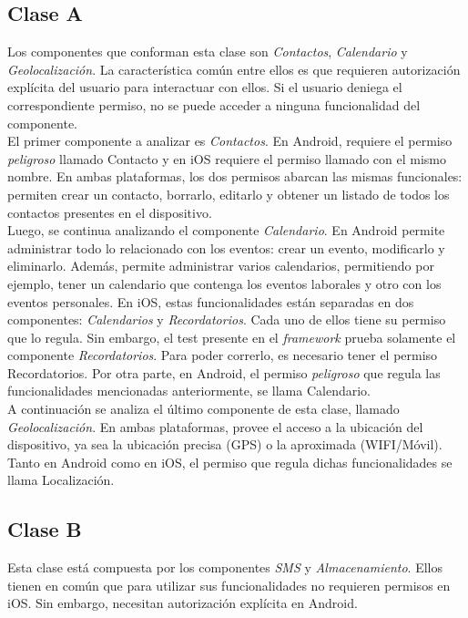 \subsection{Clase A}
Los componentes que conforman esta clase son \emph{Contactos}, \emph{Calendario} y \emph{Geolocalización}. La característica común entre ellos es que requieren autorización explícita del usuario para interactuar con ellos. Si el usuario deniega el correspondiente permiso, no se puede acceder a ninguna funcionalidad del componente.\\
El primer componente a analizar es \emph{Contactos}. En Android, requiere el permiso \textit{peligroso} llamado Contacto y en iOS requiere el permiso llamado con el mismo nombre. En ambas plataformas, los dos permisos abarcan las mismas funcionales: permiten crear un contacto, borrarlo, editarlo y obtener un listado de todos los contactos presentes en el dispositivo.\\

Luego, se continua analizando el componente \emph{Calendario}. En Android permite administrar todo lo relacionado con los eventos: crear un evento, modificarlo y eliminarlo. Además, permite administrar varios calendarios, permitiendo por ejemplo, tener un calendario que contenga los eventos laborales y otro con los eventos personales. En iOS, estas funcionalidades están separadas en dos componentes: \emph{Calendarios} y \emph{Recordatorios}. Cada uno de ellos tiene su permiso que lo regula. Sin embargo, el test presente en el \textit{framework} prueba solamente el componente \emph{Recordatorios}. Para poder correrlo, es necesario tener el permiso Recordatorios. Por otra parte, en Android, el permiso \textit{peligroso} que regula las funcionalidades mencionadas anteriormente, se llama Calendario.\\

A continuación se analiza el último componente de esta clase, llamado \emph{Geolocalización}. En ambas plataformas, provee el acceso a la ubicación del dispositivo, ya sea la ubicación precisa (GPS) o la aproximada (WIFI/Móvil). Tanto en Android como en iOS, el permiso que regula dichas funcionalidades se llama Localización.
\subsection{Clase B}
Esta clase está compuesta por los componentes \emph{SMS} y \emph{Almacenamiento}. Ellos tienen en común que para utilizar sus funcionalidades no requieren permisos en iOS. Sin embargo, necesitan autorización explícita en Android.\\

